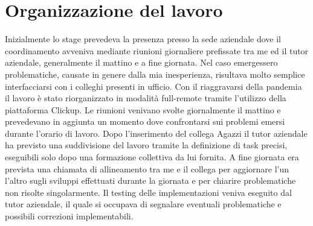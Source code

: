 \section{Organizzazione del lavoro}
Inizialmente lo stage prevedeva la presenza presso la sede aziendale dove il coordinamento avveniva mediante riunioni giornaliere prefissate tra me ed il tutor aziendale, generalmente il mattino e a fine giornata. Nel caso emergessero problematiche, causate in genere dalla mia inesperienza, risultava molto semplice interfacciarsi con i colleghi presenti in ufficio. Con il riaggravarsi della pandemia il lavoro è stato riorganizzato in modalità full-remote tramite l'utilizzo della piattaforma Clickup. Le riunioni venivano svolte giornalmente il mattino e prevedevano in aggiunta un momento dove confrontarsi sui problemi emersi durante l'orario di lavoro. Dopo l'inserimento del collega Agazzi il tutor aziendale ha previsto una suddivisione del lavoro tramite la definizione di task precisi, eseguibili solo dopo una formazione collettiva da lui fornita. A fine giornata era prevista una chiamata di allineamento tra me e il collega per aggiornare l'un l'altro sugli sviluppi effettuati durante la giornata e per chiarire problematiche non risolte singolarmente. Il testing delle implementazioni veniva eseguito dal tutor aziendale, il quale si occupava di segnalare eventuali problematiche e possibili correzioni implementabili.
